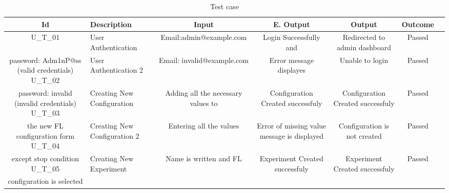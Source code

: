 \begin{table}[ht!]
    \centering
    \caption{Test case}
    \begin{tabularx}{\textwidth}{|Sl|S{X}|S{X}|S{X}|S{X}|S{X}|}
        \hline
        \textbf{Id} & \textbf{Description} &            \textbf{Input} &                        \textbf{E. Output} &                            \textbf{Output} &                       \textbf{Outcome} \\ \hline
        U\_T\_01    & User Authentication               & Email:admin@example.com                & Login Successfully and                       & Redirected to admin dashboard          & Passed     \\ \hline
                                                          password: Adm1nP@ss
                                                          (valid credentials)
        U\_T\_02    & User Authentication 2             & Email: invalid@example.com             & Error message displayes                      & Unable to login                        & Passed    \\ \hline
                                                            password: invalid
                                                            (invalid credentials)
        U\_T\_03    & Creating New Configuration        & Adding all the necessary values to     & Configuration Created successfuly            & Configuration Created successfuly      & Passed     \\ \hline
                                                            the new FL configuration form
        U\_T\_04    & Creating New Configuration 2      & Entering all the values                & Error of missing value message is displayed  & Configuration is not created           & Passed       \\ \hline
                                                            except stop condition
        U\_T\_05    & Creating New Experiment           & Name is written and FL                 & Experiment Created successfuly               & Experiment Created successfuly         & Passed     \\ \hline
                                                            configuration is selected
    \end{tabularx}
\end{table}
